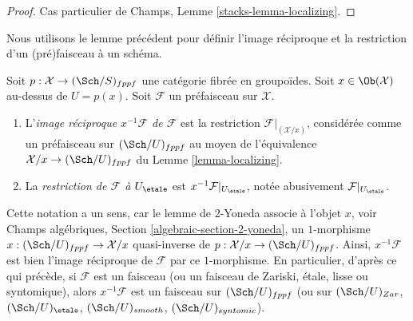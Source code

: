 \begin{proof}
Cas particulier de Champs, Lemme \ref{stacks-lemma-localizing}.
\end{proof}

\noindent
Nous utilisons le lemme précédent pour définir l'image réciproque et la restriction
d'un (pré)faisceau à un schéma.

\begin{definition}
\label{definition-pullback}
Soit $p : \mathcal{X} \to (\Sch/S)_{fppf}$ une catégorie fibrée
en groupoïdes. Soit $x \in \Ob(\mathcal{X})$ au-dessus de $U = p(x)$.
Soit $\mathcal{F}$ un préfaisceau sur $\mathcal{X}$.
\begin{enumerate}
\item L'{\it image réciproque $x^{-1}\mathcal{F}$ de $\mathcal{F}$} est la
restriction $\mathcal{F}|_{(\mathcal{X}/x)}$, considérée comme un préfaisceau sur
$(\Sch/U)_{fppf}$ au moyen de l'équivalence
$\mathcal{X}/x \to (\Sch/U)_{fppf}$ du
Lemme \ref{lemma-localizing}.
\item La {\it restriction de $\mathcal{F}$ à $U_\etale$}
est $x^{-1}\mathcal{F}|_{U_\etale}$, notée abusivement
$\mathcal{F}|_{U_\etale}$.
\end{enumerate}
\end{definition}

\noindent
Cette notation a un sens, car le lemme de $2$-Yoneda associe à l'objet $x$, voir
Champs algébriques, Section \ref{algebraic-section-2-yoneda},
un $1$-morphisme $x : (\Sch/U)_{fppf} \to \mathcal{X}/x$
quasi-inverse de $p : \mathcal{X}/x \to (\Sch/U)_{fppf}$.
Ainsi, $x^{-1}\mathcal{F}$ est bien l'image réciproque de $\mathcal{F}$ par ce
$1$-morphisme. En particulier, d'après ce qui précède, si $\mathcal{F}$
est un faisceau (ou un faisceau de Zariski, étale, lisse ou syntomique), alors
$x^{-1}\mathcal{F}$ est un faisceau sur $(\Sch/U)_{fppf}$ (ou sur
$(\Sch/U)_{Zar}$, $(\Sch/U)_\etale$,
$(\Sch/U)_{smooth}$, $(\Sch/U)_{syntomic}$).


